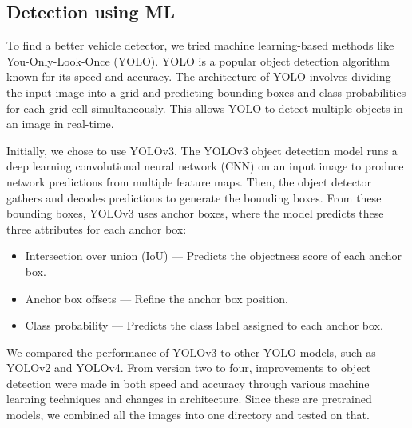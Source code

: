 \documentclass{article}
\begin{document}
\subsection{Detection using ML}
To find a better vehicle detector, we tried machine learning-based methods like You-Only-Look-Once (YOLO). YOLO is a popular object detection algorithm known for its speed and accuracy. The architecture of YOLO involves dividing the input image into a grid and predicting bounding boxes and class probabilities for each grid cell simultaneously. This allows YOLO to detect multiple objects in an image in real-time.

Initially, we chose to use YOLOv3. The YOLOv3 object detection model runs a deep learning convolutional neural network (CNN) on an input image to produce network predictions from multiple feature maps. Then, the object detector gathers and decodes predictions to generate the bounding boxes. From these bounding boxes, YOLOv3 uses anchor boxes, where the model predicts these three attributes for each anchor box:
\begin{itemize}
    \item Intersection over union (IoU) — Predicts the objectness score of each anchor box.
    \item Anchor box offsets — Refine the anchor box position.
    \item Class probability — Predicts the class label assigned to each anchor box.
\end{itemize}

We compared the performance of YOLOv3 to other YOLO models, such as YOLOv2 and YOLOv4. From version two to four, improvements to object detection were made in both speed and accuracy through various machine learning techniques and changes in architecture. Since these are pretrained models, we combined all the images into one directory and tested on that.
\end{document}
